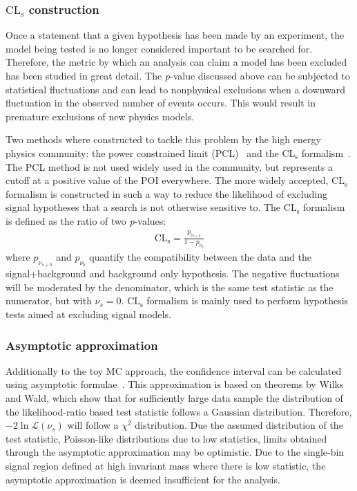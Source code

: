 \subsubsection{$\mathrm{CL}_\mathrm{s}$ construction}
Once a statement that a given hypothesis has been made by an experiment, the model being tested is no longer considered important to be searched for. Therefore, the metric by which an analysis can claim a model has been excluded has been studied in great detail. The \emph{p}-value discussed above can be subjected to statistical fluctuations and can lead to nonphysical exclusions when a downward fluctuation in the observed number of events occurs. This would result in premature exclusions of new physics models. 

Two methods where constructed to tackle this problem by the high energy physics community: the power constrained limit (PCL)~\cite{PhysRevLett.122.231801} and the $\mathrm{CL}_\mathrm{s}$ formalism~\cite{JUNK1999435,Read_2002}. The PCL method is not used widely used in the community, but represents a cutoff at a positive value of the POI everywhere. The more widely accepted, $\mathrm{CL}_\mathrm{s}$ formalism is constructed in such a way to reduce the likelihood of excluding signal hypotheses that a search is not otherwise sensitive to. The $\mathrm{CL}_\mathrm{s}$ formalism is defined as the ratio of two \emph{p}-values:
\begin{equation}
    \label{eq:cls}
    \begin{aligned}
        \mathrm{CL}_\mathrm{s} = \frac{p_{\nu_{s+b}}}{1-p_{\nu_{b}}}
    \end{aligned}
\end{equation}
where $p_{\nu_{s+b}}$ and $p_{\nu_{b}}$ quantify the compatibility between the data and the signal+background and background only hypothesis. The negative fluctuations will be moderated by the denominator, which is the same test statistic as the numerator, but with $\nu_s = 0$. $\mathrm{CL}_\mathrm{s}$ formalism is mainly used to perform hypothesis tests aimed at excluding signal models. 

\subsubsection{Asymptotic approximation}
Additionally to the toy MC approach, the confidence interval can be calculated using asymptotic formulae~\cite{Cowan:2010js}. This approximation is based on theorems by Wilks and Wald, which show that for sufficiently large data sample the distribution of the likelihood-ratio based test statistic follows a Gaussian distribution. Therefore, $-2\ln\mathcal{L}(\nu_s)$ will follow a $\chi^2$ distribution. Due the assumed distribution of the test statistic, Poisson-like distributions due to low statistics, limits obtained through the asymptotic approximation may be optimistic. Due to the single-bin signal region defined at high invariant mass where there is low statistic, the asymptotic approximation is deemed insufficient for the analysis. 

